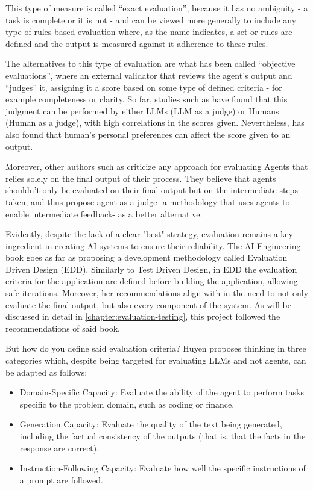 \documentclass[a4paper]{report}
\begin{document}
This type of measure is called ``exact evaluation'', because it has no ambiguity - a task is complete or it is not - and can be viewed more generally to include any type of rules-based evaluation where, as the name indicates, a set or rules are defined and the output is measured against it adherence to these rules.

The alternatives to this type of evaluation are what has been called ``objective evaluations'', where an external validator that reviews the agent's output and ``judges'' it, assigning it a score based on some type of defined criteria - for example completeness or clarity. So far, studies such as \cite{wang2025replacehumanevaluators} have found that this judgment can be performed by either LLMs (LLM as a judge) or Humans (Human as a judge), with high correlations in the scores given. Nevertheless, \cite{hu2023decipher} has also found that human's personal preferences can affect the score given to an output.

Moreover, other authors such as \cite{zhuge2024agentasajudgeevaluateagentsagents} criticize any approach for evaluating Agents that relies solely on the final output of their process. They believe that agents shouldn't only be evaluated on their final output but on the intermediate steps taken, and thus propose agent as a judge -a methodology that uses agents to enable intermediate feedback- as a better alternative.

Evidently, despite the lack of a clear "best" strategy, evaluation remains a key ingredient in creating AI systems to ensure their reliability. The AI Engineering book goes as far as proposing a development methodology called Evaluation Driven Design (EDD). Similarly to Test Driven Design, in EDD the evaluation criteria for the application are defined before building the application, allowing safe iterations. Moreover, her recommendations align with \cite{zhuge2024agentasajudgeevaluateagentsagents} in the need to not only evaluate the final output, but also every component of the system. As will be discussed in detail in \autoref{chapter:evaluation-testing}, this project followed the recommendations of said book.

But how do you define said evaluation criteria? Huyen proposes thinking in three categories which, despite being targeted for evaluating LLMs and not agents, can be adapted as follows:

\begin{itemize}
    \item Domain-Specific Capacity: Evaluate the ability of the agent to perform tasks specific to the problem domain, such as coding or finance.
    \item Generation Capacity: Evaluate the quality of the text being generated, including the factual consistency of the outputs (that is, that the facts in the response are correct).
    \item Instruction-Following Capacity: Evaluate how well the specific instructions of a prompt are followed.
\end{itemize}
\end{document}
